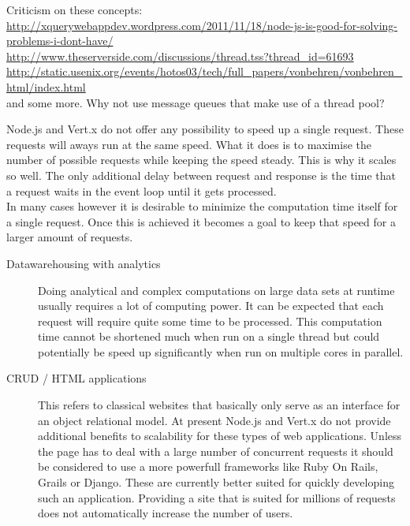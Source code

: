 Criticism on these concepts:\\
\url{http://xquerywebappdev.wordpress.com/2011/11/18/node-js-is-good-for-solving-problems-i-dont-have/}\\
\url{http://www.theserverside.com/discussions/thread.tss?thread_id=61693}\\
\url{http://static.usenix.org/events/hotos03/tech/full_papers/vonbehren/vonbehren_html/index.html}\\
and some more. Why not use message queues that make use of a thread pool?

Node.js and Vert.x do not offer any possibility to speed up a single request. These requests will aways
run at the same speed. What it does is to maximise the number of possible requests while keeping the speed
steady. This is why it scales so well. The only additional delay between request and response is the time
that a request waits in the event loop until it gets processed.\\
In many cases however it is desirable to minimize the computation time itself for a single request.
Once this is achieved it becomes a goal to keep that speed for a larger amount of requests.

\begin{description}
  \item[Datawarehousing with analytics] Doing analytical and complex computations
  	on large data sets at runtime usually requires a lot of computing power.
  	It can be expected that each request will require quite some time to be processed.
  	This computation time cannot be shortened much when run on a single thread but 
  	could potentially be speed up significantly when run on multiple cores in parallel. 
  \item[CRUD / HTML applications] 
	This refers to classical websites that basically only serve as an interface for
	an object relational model.
	At present Node.js and Vert.x do not provide additional benefits to scalability
	for these types of web applications. Unless the page has to deal with a large number of
	concurrent requests it should be considered to use a more powerfull frameworks
	like Ruby On Rails, Grails or Django. These are currently better suited for quickly
	developing such an application. Providing a site that is suited for 
	millions of requests does not automatically increase the number of users.
\end{description}
    

